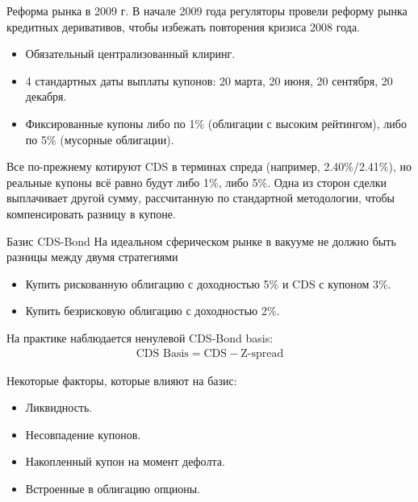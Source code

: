 \documentclass{beamer}
\begin{document}
\begin{frame}{Реформа рынка в 2009 г.}
\justify
В начале 2009 года регуляторы провели реформу рынка кредитных деривативов, чтобы избежать повторения кризиса 2008 года.

\begin{itemize}
\justifying
\item Обязательный централизованный клиринг.
\item 4 стандартных даты выплаты купонов: 20 марта, 20 июня, 20 сентября, 20 декабря.
\item Фиксированные купоны либо по 1\% (облигации с высоким рейтингом), либо по 5\% (мусорные облигации).
\end{itemize}

\justify
Все по-прежнему котируют CDS в терминах спреда (например, 2.40\%/2.41\%), но реальные купоны всё равно будут либо 1\%, либо 5\%. Одна из сторон сделки выплачивает другой сумму, рассчитанную по стандартной методологии, чтобы компенсировать разницу в купоне.
\end{frame}



\begin{frame}{Базис CDS-Bond}
\justify
На идеальном сферическом рынке в вакууме не должно быть разницы между двумя стратегиями
\begin{itemize}
\justifying
\item Купить рискованную облигацию с доходностью 5\% и CDS с купоном 3\%.
\item Купить безрисковую облигацию с доходностью 2\%.
\end{itemize}

\justify
На практике наблюдается ненулевой CDS-Bond basis:
\begin{align*}
\text{CDS Basis} = \text{CDS} - \text{Z-spread}
\end{align*}

\justify
Некоторые факторы, которые влияют на базис:
\begin{itemize}
\justifying
\item Ликвидность.
\item Несовпадение купонов.
\item Накопленный купон на момент дефолта.
\item Встроенные в облигацию опционы.
\end{itemize}
\end{frame}
\end{document}
